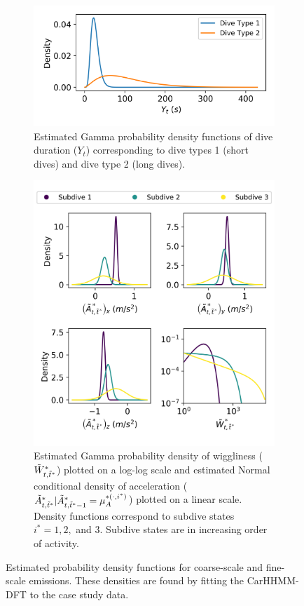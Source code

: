 \begin{figure}[ht]
    \begin{subfigure}{\textwidth}
    	\centering
    	\includegraphics[width=4in]{../Plots/CarHHMM2-coarse-emissions.png}
    	\caption{Estimated Gamma probability density functions of dive duration ($Y_t$) corresponding to dive types 1 (short dives) and dive type 2 (long dives).}
    	\label{fig:coarse_emis}
    \end{subfigure}
    \newline
    \begin{subfigure}{\textwidth}
    	\centering
    	\includegraphics[width=4in]{../Plots/CarHHMM2-fine-emissions.png}
    	\caption{Estimated Gamma probability density of wiggliness ($\tilde{W}^*_{t,\tilde t^*}$) plotted on a log-log scale and estimated Normal conditional density of acceleration ($\tilde{A}^*_{t,\tilde t^*}|\tilde{A}^*_{t,\tilde t^*-1} = \mu_A^{*(\cdot,i^*)}$) plotted on a linear scale. Density functions correspond to subdive states $i^* = 1,2,$ and $3$. Subdive states are in increasing order of activity.}
    	\label{fig:fine_emis}
    \end{subfigure}
    \caption{Estimated probability density functions for coarse-scale and fine-scale emissions. These densities are found by fitting the CarHHMM-DFT to the case study data.}
    \label{fig:emis}
\end{figure}

